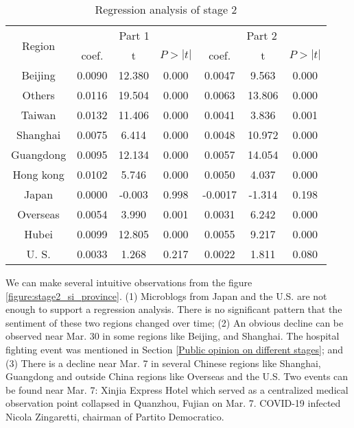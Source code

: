 \documentclass[sigconf, nonacm=true]{acmart}
\begin{document}
\begin{table}[t]
\small%
\begin{tabular}{|c|c|c|c|c|c|c|}
\hline
\multirow{2}{*}{Region} & \multicolumn{3}{c|}{Part 1} & \multicolumn{3}{c|}{Part 2} \\\cline{2-7}
                  &  coef.     &    t   &   $P>|t|$   &     coef.  &    t   &  $P>|t|$    \\\hline
                  Beijing&  0.0090     &    12.380   &   0.000   &   0.0047   &  9.563     &  0.000    \\\hline
      Others        &      0.0116 &    19.504  &  0.000     &   0.0063   &   13.806  &     0.000         \\\hline
        Taiwan          &  0.0132   &   11.406    &   0.000   &   0.0041    & 3.836      &  0.001    \\\hline
        Shanghai          &  0.0075     &   6.414    &   0.000   &    0.0048  &    10.972 &   0.000   \\\hline
         Guangdong         &   0.0095   &   12.134    & 0.000    &   0.0057   &   14.054    &  0.000 \\\hline
         Hong kong    &  0.0102    &   5.746    &    0.000   &   0.0050   &4.037   &    0.000       \\\hline
         Japan &   0.0000    &    -0.003   &   0.998  &   -0.0017   & -1.314     & 0.198    \\\hline
         Overseas &    0.0054   &   3.990   & 0.001   &   0.0031   & 6.242    & 0.000    \\\hline
         Hubei &    0.0099   &   12.805   & 0.000    &  0.0055     &   9.217   &   0.000  \\\hline
         U. S. &    0.0033  &   1.268    & 0.217     &   0.0022   &    1.811   &  0.080 \\\hline\end{tabular}
\caption{Regression analysis of stage 2}
\label{table:reg_stage2}
\end{table}
We can make several intuitive observations from the figure \ref{figure:stage2_si_province}.
(1) Microblogs from Japan and the U.S. are not enough to support a regression analysis.
There is no significant pattern that the sentiment of these two regions changed over time;
(2) An obvious decline can be observed near Mar. 30 in some regions like Beijing, and Shanghai. The hospital fighting event was mentioned in Section \ref{Public opinion on different stages}; and 
(3) There is a decline near Mar. 7 in several Chinese regions like Shanghai, Guangdong and outside China regions like Overseas and the U.S.
Two events can be found near Mar. 7:
Xinjia Express Hotel which served as a centralized medical observation point collapsed in Quanzhou, Fujian on Mar. 7.
COVID-19 infected Nicola Zingaretti, chairman of Partito Democratico.
\vspace{-0.2cm}
\end{document}
